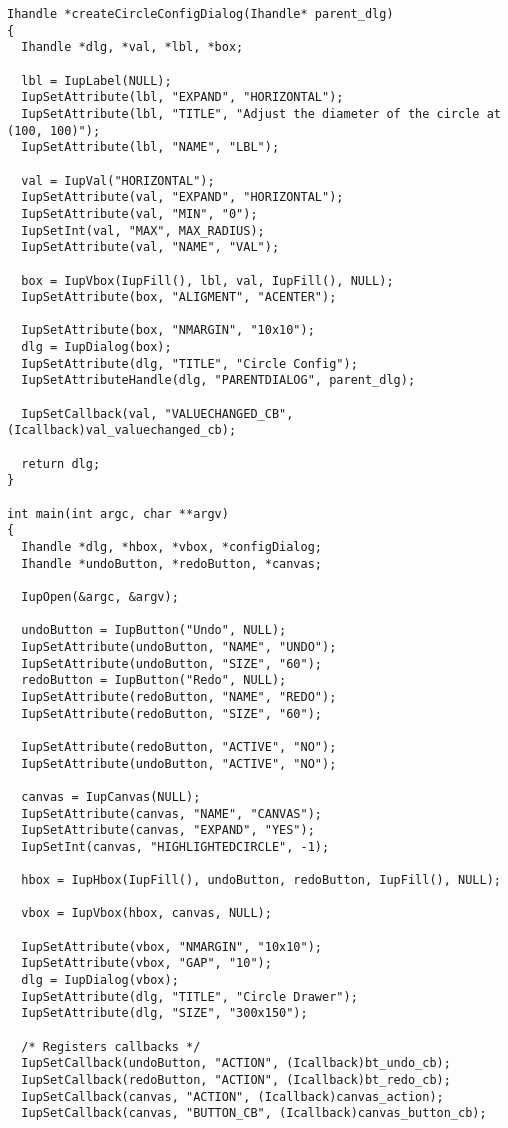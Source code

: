 \documentclass{ctexart}
\begin{document}
\begin{lstlisting}
Ihandle *createCircleConfigDialog(Ihandle* parent_dlg)
{
  Ihandle *dlg, *val, *lbl, *box;

  lbl = IupLabel(NULL);
  IupSetAttribute(lbl, "EXPAND", "HORIZONTAL");
  IupSetAttribute(lbl, "TITLE", "Adjust the diameter of the circle at (100, 100)");
  IupSetAttribute(lbl, "NAME", "LBL");

  val = IupVal("HORIZONTAL");
  IupSetAttribute(val, "EXPAND", "HORIZONTAL");
  IupSetAttribute(val, "MIN", "0");
  IupSetInt(val, "MAX", MAX_RADIUS);
  IupSetAttribute(val, "NAME", "VAL");

  box = IupVbox(IupFill(), lbl, val, IupFill(), NULL);
  IupSetAttribute(box, "ALIGMENT", "ACENTER");

  IupSetAttribute(box, "NMARGIN", "10x10");
  dlg = IupDialog(box);
  IupSetAttribute(dlg, "TITLE", "Circle Config");
  IupSetAttributeHandle(dlg, "PARENTDIALOG", parent_dlg);

  IupSetCallback(val, "VALUECHANGED_CB", (Icallback)val_valuechanged_cb);

  return dlg;
}

int main(int argc, char **argv)
{
  Ihandle *dlg, *hbox, *vbox, *configDialog;
  Ihandle *undoButton, *redoButton, *canvas;

  IupOpen(&argc, &argv);

  undoButton = IupButton("Undo", NULL);
  IupSetAttribute(undoButton, "NAME", "UNDO");
  IupSetAttribute(undoButton, "SIZE", "60");
  redoButton = IupButton("Redo", NULL);
  IupSetAttribute(redoButton, "NAME", "REDO");
  IupSetAttribute(redoButton, "SIZE", "60");

  IupSetAttribute(redoButton, "ACTIVE", "NO");
  IupSetAttribute(undoButton, "ACTIVE", "NO");

  canvas = IupCanvas(NULL);
  IupSetAttribute(canvas, "NAME", "CANVAS");
  IupSetAttribute(canvas, "EXPAND", "YES");
  IupSetInt(canvas, "HIGHLIGHTEDCIRCLE", -1);

  hbox = IupHbox(IupFill(), undoButton, redoButton, IupFill(), NULL);

  vbox = IupVbox(hbox, canvas, NULL);

  IupSetAttribute(vbox, "NMARGIN", "10x10");
  IupSetAttribute(vbox, "GAP", "10");
  dlg = IupDialog(vbox);
  IupSetAttribute(dlg, "TITLE", "Circle Drawer");
  IupSetAttribute(dlg, "SIZE", "300x150");

  /* Registers callbacks */
  IupSetCallback(undoButton, "ACTION", (Icallback)bt_undo_cb);
  IupSetCallback(redoButton, "ACTION", (Icallback)bt_redo_cb);
  IupSetCallback(canvas, "ACTION", (Icallback)canvas_action);
  IupSetCallback(canvas, "BUTTON_CB", (Icallback)canvas_button_cb);


\end{lstlisting}
\end{document}
